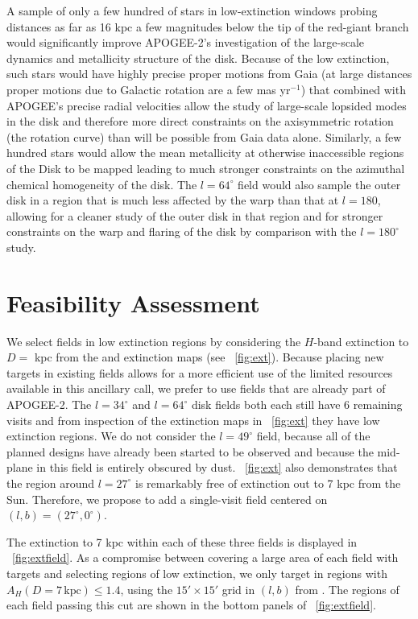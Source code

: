 \documentclass[12pt,preprint]{aastex}
\begin{document}
A sample of only a few hundred of stars in low-extinction windows
probing distances as far as 16 kpc a few magnitudes below the tip of
the red-giant branch would significantly improve APOGEE-2's
investigation of the large-scale dynamics and metallicity structure of
the disk. Because of the low extinction, such stars would have highly
precise proper motions from Gaia (at large distances proper motions
due to Galactic rotation are a few mas yr$^{-1}$) that combined with
APOGEE’s precise radial velocities allow the study of large-scale
lopsided modes in the disk and therefore more direct constraints on
the axisymmetric rotation (the rotation curve) than will be possible
from Gaia data alone. Similarly, a few hundred stars would allow the
mean metallicity at otherwise inaccessible regions of the Disk to be
mapped leading to much stronger constraints on the azimuthal chemical
homogeneity of the disk. The $l=64^\circ$ field would also sample the
outer disk in a region that is much less affected by the warp than
that at $l=180$, allowing for a cleaner study of the outer disk in that
region and for stronger constraints on the warp and flaring of the
disk by comparison with the $l=180^\circ$ study.

\section{Feasibility Assessment}

We select fields in low extinction regions by considering the $H$-band
extinction to $D=$ kpc from the \citet{Marshall06a} and
\citet{Green15a} extinction maps (see
\figurename~\ref{fig:ext}). Because placing new targets in existing
fields allows for a more efficient use of the limited resources
available in this ancillary call, we prefer to use fields that are
already part of APOGEE-2. The $l=34^\circ$ and $l=64^\circ$ disk
fields both each still have 6 remaining visits and from inspection of
the extinction maps in \figurename~\ref{fig:ext} they have low
extinction regions. We do not consider the $l=49^\circ$ field, because
all of the planned designs have already been started to be observed
and because the mid-plane in this field is entirely obscured by
dust. \figurename~\ref{fig:ext} also demonstrates that the region
around $l=27^\circ$ is remarkably free of extinction out to 7 kpc from
the Sun. Therefore, we propose to add a single-visit field centered on
$(l,b) = (27^\circ,0^\circ)$.

The extinction to 7 kpc within each of these three fields is displayed
in \figurename~\ref{fig:extfield}. As a compromise between covering a
large area of each field with targets and selecting regions of low
extinction, we only target in regions with $A_H(D=7\,\mathrm{kpc})
\leq 1.4$, using the $15'\times15'$ grid in $(l,b)$ from
\citet{Marshall06a}. The regions of each field passing this cut are
shown in the bottom panels of \figurename~\ref{fig:extfield}.
\end{document}

